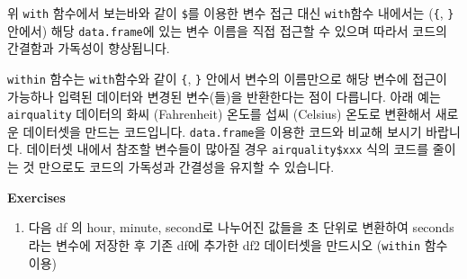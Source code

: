 \documentclass[
  a4paper,
]{book}
\newenvironment{Shaded}{\begin{snugshade}}{\end{snugshade}}
\newcommand{\DecValTok}[1]{\textcolor[rgb]{0.68,0.00,0.00}{#1}}
\newcommand{\DocumentationTok}[1]{\textcolor[rgb]{0.37,0.37,0.37}{\textit{#1}}}
\newcommand{\FunctionTok}[1]{\textcolor[rgb]{0.28,0.35,0.67}{#1}}
\newcommand{\NormalTok}[1]{\textcolor[rgb]{0.00,0.23,0.31}{#1}}
\newcommand{\OtherTok}[1]{\textcolor[rgb]{0.00,0.23,0.31}{#1}}
\newcommand{\SpecialCharTok}[1]{\textcolor[rgb]{0.37,0.37,0.37}{#1}}
\providecommand{\tightlist}{%
  \setlength{\itemsep}{0pt}\setlength{\parskip}{0pt}}\usepackage{longtable,booktabs,array}
\begin{document}
위 \texttt{with} 함수에서 보는바와 같이 \texttt{\$}를 이용한 변수 접근
대신 \texttt{with}함수 내에서는 (\texttt{\{}, \texttt{\}} 안에서) 해당
\texttt{data.frame}에 있는 변수 이름을 직접 접근할 수 있으며 따라서
코드의 간결함과 가독성이 향상됩니다.

\texttt{within} 함수는 \texttt{with}함수와 같이 \texttt{\{}, \texttt{\}}
안에서 변수의 이름만으로 해당 변수에 접근이 가능하나 입력된 데이터와
변경된 변수(들)을 반환한다는 점이 다릅니다. 아래 예는
\texttt{airquality} 데이터의 화씨 (Fahrenheit) 온도를 섭씨 (Celsius)
온도로 변환해서 새로운 데이터셋을 만드는 코드입니다.
\texttt{data.frame}을 이용한 코드와 비교해 보시기 바랍니다. 데이터셋
내에서 참조할 변수들이 많아질 경우 \texttt{airquality\$xxx} 식의 코드를
줄이는 것 만으로도 코드의 가독성과 간결성을 유지할 수 있습니다.

\begin{Shaded}
\end{Shaded}

\textbf{Exercises}

\begin{enumerate}
\def\labelenumi{\arabic{enumi})}
\tightlist
\item
  다음 df 의 hour, minute, second로 나누어진 값들을 초 단위로 변환하여
  seconds라는 변수에 저장한 후 기존 df에 추가한 df2 데이터셋을 만드시오
  (\texttt{within} 함수 이용)
\end{enumerate}
\end{document}

